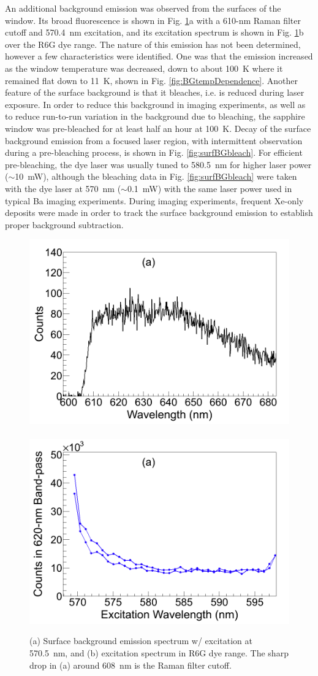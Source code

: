 An additional background emission was observed from the surfaces of the window.  Its broad fluorescence is shown in Fig. \ref{fig:surfBG}a with a 610-nm Raman filter cutoff and 570.4~nm excitation, and its excitation spectrum is shown in Fig. \ref{fig:surfBG}b over the R6G dye range.  The nature of this emission has not been determined, however a few characteristics were identified.  One was that the emission increased as the window temperature was decreased, down to about 100~K where it remained flat down to 11~K, shown in Fig. \ref{fig:BGtempDependence}.  Another feature of the surface background is that it bleaches, i.e. is reduced during laser exposure.  In order to reduce this background in imaging experiments, as well as to reduce run-to-run variation in the background due to bleaching, the sapphire window was pre-bleached for at least half an hour at 100~K.  Decay of the surface background emission from a focused laser region, with intermittent observation during a pre-bleaching process, is shown in Fig. \ref{fig:surfBGbleach}.  For efficient pre-bleaching, the dye laser was usually tuned to 580.5~nm for higher laser power ($\sim$10~mW), although the bleaching data in Fig. \ref{fig:surfBGbleach} were taken with the dye laser at 570~nm ($\sim$0.1~mW) with the same laser power used in typical Ba imaging experiments.  During imaging experiments, frequent Xe-only deposits were made in order to track the surface background emission to establish proper background subtraction.

\begin{figure} %
        \centering
                \includegraphics[width=.5\textwidth]{figures/surfaceBG_a.png}
                ~
                \includegraphics[width=.5\textwidth]{figures/surfaceBG_b.png}
                \caption{(a) Surface background emission spectrum w/ excitation at 570.5~nm, and (b) excitation spectrum in R6G dye range.  The sharp drop in (a) around 608~nm is the Raman filter cutoff.}
\label{fig:surfBG}
\end{figure}

